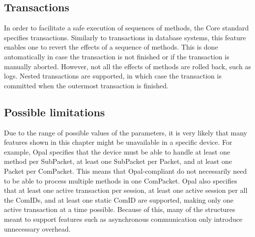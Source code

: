 


\subsection{Transactions}

In order to facilitate a safe execution of sequences of methods, the Core standard specifies transactions. Similarly to transactions in database systems, this feature enables one to revert the effects of a sequence of methods. This is done automatically in case the transaction is not finished or if the transaction is manually aborted. However, not all the effects of methods are rolled back, such as logs. Nested transactions are supported, in which case the transaction is committed when the outermost transaction is finished.

\subsection{Possible limitations}

Due to the range of possible values of the parameters, it is very likely that many features shown in this chapter might be unavailable in a specific device.
For example, Opal specifies that the device must be able to handle at least one method per SubPacket, at least one SubPacket per Packet, and at least one Packet per ComPacket. This means that Opal-compliant do not necessarily need to be able to process multiple methods in one ComPacket.
Opal also specifies that at least one active transaction per session, at least one active session per all the ComIDs, and at least one static ComID are supported, making only one active transaction at a time possible.
Because of this, many of the structures meant to support features such as asynchronous communication only introduce unnecessary overhead.




